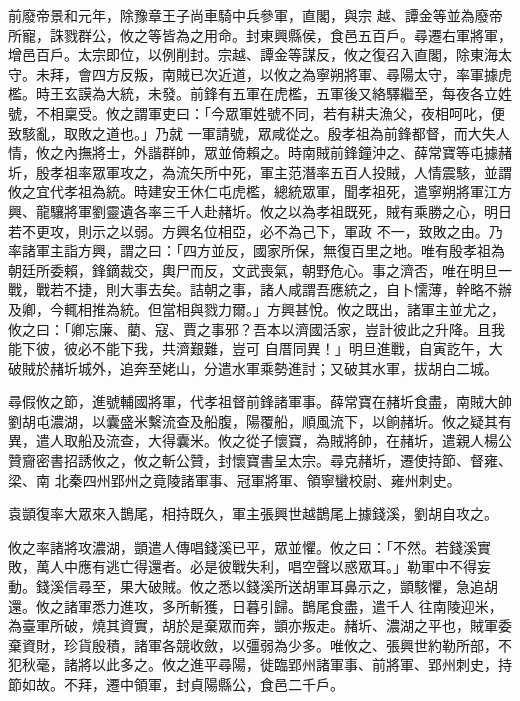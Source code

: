 \begin{pinyinscope}
 前廢帝景和元年，除豫章王子尚車騎中兵參軍，直閣，與宗
 越、譚金等並為廢帝所寵，誅戮群公，攸之等皆為之用命。封東興縣侯，食邑五百戶。尋遷右軍將軍，增邑百戶。太宗即位，以例削封。宗越、譚金等謀反，攸之復召入直閣，除東海太守。未拜，會四方反叛，南賊已次近道，以攸之為寧朔將軍、尋陽太守，率軍據虎檻。時王玄謨為大統，未發。前鋒有五軍在虎檻，五軍後又絡驛繼至，每夜各立姓號，不相稟受。攸之謂軍吏曰：「今眾軍姓號不同，若有耕夫漁父，夜相呵叱，便致駭亂，取敗之道也。」乃就
 一軍請號，眾咸從之。殷孝祖為前鋒都督，而大失人情，攸之內撫將士，外諧群帥，眾並倚賴之。時南賊前鋒鐘沖之、薛常寶等屯據赭圻，殷孝祖率眾軍攻之，為流矢所中死，軍主范潛率五百人投賊，人情震駭，並謂攸之宜代孝祖為統。時建安王休仁屯虎檻，總統眾軍，聞孝祖死，遣寧朔將軍江方興、龍驤將軍劉靈遺各率三千人赴赭圻。攸之以為孝祖既死，賊有乘勝之心，明日若不更攻，則示之以弱。方興名位相亞，必不為己下，軍政
 不一，致敗之由。乃率諸軍主詣方興，謂之曰：「四方並反，國家所保，無復百里之地。唯有殷孝祖為朝廷所委賴，鋒鏑裁交，輿尸而反，文武喪氣，朝野危心。事之濟否，唯在明旦一戰，戰若不捷，則大事去矣。詰朝之事，諸人咸謂吾應統之，自卜懦薄，幹略不辦及卿，今輒相推為統。但當相與戮力爾。」方興甚悅。攸之既出，諸軍主並尤之，攸之曰：「卿忘廉、藺、寇、賈之事邪？吾本以濟國活家，豈計彼此之升降。且我能下彼，彼必不能下我，共濟艱難，豈可
 自厝同異！」明旦進戰，自寅訖午，大破賊於赭圻城外，追奔至姥山，分遣水軍乘勢進討；又破其水軍，拔胡白二城。



 尋假攸之節，進號輔國將軍，代孝祖督前鋒諸軍事。薛常寶在赭圻食盡，南賊大帥劉胡屯濃湖，以囊盛米繫流查及船腹，陽覆船，順風流下，以餉赭圻。攸之疑其有異，遣人取船及流查，大得囊米。攸之從子懷寶，為賊將帥，在赭圻，遣親人楊公贊齎密書招誘攸之，攸之斬公贊，封懷寶書呈太宗。尋克赭圻，遷使持節、督雍、梁、南
 北秦四州郢州之竟陵諸軍事、冠軍將軍、領寧蠻校尉、雍州刺史。



 袁顗復率大眾來入鵲尾，相持既久，軍主張興世越鵲尾上據錢溪，劉胡自攻之。



 攸之率諸將攻濃湖，顗遣人傳唱錢溪已平，眾並懼。攸之曰：「不然。若錢溪實敗，萬人中應有逃亡得還者。必是彼戰失利，唱空聲以惑眾耳。」勒軍中不得妄動。錢溪信尋至，果大破賊。攸之悉以錢溪所送胡軍耳鼻示之，顗駭懼，急追胡還。攸之諸軍悉力進攻，多所斬獲，日暮引歸。鵲尾食盡，遣千人
 往南陵迎米，為臺軍所破，燒其資實，胡於是棄眾而奔，顗亦叛走。赭圻、濃湖之平也，賊軍委棄資財，珍貨殷積，諸軍各競收斂，以彊弱為少多。唯攸之、張興世約勒所部，不犯秋毫，諸將以此多之。攸之進平尋陽，徙臨郢州諸軍事、前將軍、郢州刺史，持節如故。不拜，遷中領軍，封貞陽縣公，食邑二千戶。




\end{pinyinscope}
